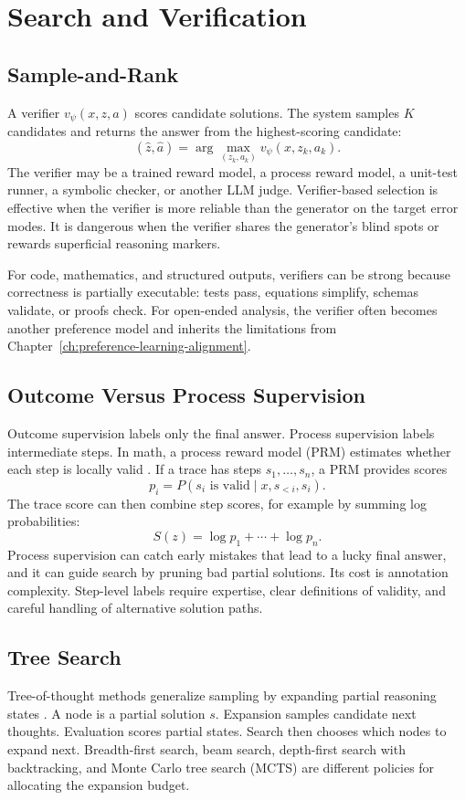 \section{Search and Verification}
\subsection{Sample-and-Rank}
A verifier $v_\psi(x,z,a)$ scores candidate solutions. The system samples $K$ candidates and returns the answer from the highest-scoring candidate:
\[
    (\hat{z},\hat{a})
    =
    \arg\max_{(z_k,a_k)}
    v_\psi(x,z_k,a_k).
\]
The verifier may be a trained reward model, a process reward model, a unit-test runner, a symbolic checker, or another LLM judge. Verifier-based selection is effective when the verifier is more reliable than the generator on the target error modes. It is dangerous when the verifier shares the generator's blind spots or rewards superficial reasoning markers.

For code, mathematics, and structured outputs, verifiers can be strong because correctness is partially executable: tests pass, equations simplify, schemas validate, or proofs check. For open-ended analysis, the verifier often becomes another preference model and inherits the limitations from Chapter~\ref{ch:preference-learning-alignment}.

\subsection{Outcome Versus Process Supervision}
Outcome supervision labels only the final answer. Process supervision labels intermediate steps. In math, a process reward model (PRM) estimates whether each step is locally valid \cite{lightman2023lets}. If a trace has steps $s_1,\ldots,s_n$, a PRM provides scores
\[
    p_i = P(s_i \text{ is valid} \mid x,s_{<i},s_i).
\]
The trace score can then combine step scores, for example by summing log probabilities:
\[
    S(z)=\log p_1+\cdots+\log p_n.
\]
Process supervision can catch early mistakes that lead to a lucky final answer, and it can guide search by pruning bad partial solutions. Its cost is annotation complexity. Step-level labels require expertise, clear definitions of validity, and careful handling of alternative solution paths.

\subsection{Tree Search}
Tree-of-thought methods generalize sampling by expanding partial reasoning states \cite{yao2023tree}. A node is a partial solution $s$. Expansion samples candidate next thoughts. Evaluation scores partial states. Search then chooses which nodes to expand next. Breadth-first search, beam search, depth-first search with backtracking, and Monte Carlo tree search (MCTS) are different policies for allocating the expansion budget.

